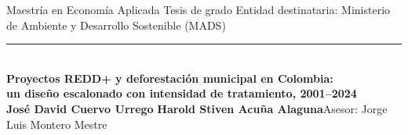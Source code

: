 \documentclass[final,t]{beamer}
\begin{document}
\begin{frame}[t]{}

\begin{tcolorbox}[colback=dosel,colframe=dosel,boxrule=0pt,sharp corners,
  left=1.2cm,right=1.2cm,top=1.0cm,bottom=1.0cm]
  {\color{papel!70}\normalsize Maestría en Economía Aplicada \quad\textbullet\quad Tesis de grado
   \hfill Entidad destinataria: Ministerio de Ambiente y Desarrollo Sostenible (MADS)}\\[0.3cm]
  {\color{papel!40}\rule{\linewidth}{1pt}}\\[0.6cm]
  {\color{papel}\fontsize{72}{80}\selectfont\bfseries
   Proyectos REDD+ y deforestación municipal en Colombia:}\\[0.35cm]
  {\color{papel!80}\fontsize{50}{58}\selectfont\bfseries
   un diseño escalonado con intensidad de tratamiento, 2001--2024}\\[0.7cm]
  {\color{papel!85}\large\textbf{José David Cuervo Urrego}\quad\textbullet\quad
   \textbf{Harold Stiven Acuña Alaguna}\qquad Asesor: Jorge Luis Montero Mestre}
\end{tcolorbox}




\end{frame}
\end{document}
